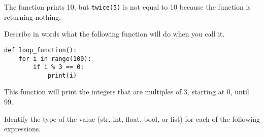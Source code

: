 \documentclass[12pt]{exam}
\begin{document}
\begin{questions}
\begin{solution}
The function prints 10, but \lstinline{twice(5)} is not equal to 10 because the function is returning nothing.  
\end{solution}
\vfill

\question Describe in words what the following function will do when you call it.

\begin{lstlisting}
def loop_function():
    for i in range(100):
        if i % 3 == 0:
            print(i)
\end{lstlisting}

\begin{solution}
This function will print the integers that are multiples of 3, starting at 0, until 99. 
\end{solution}

\question Identify the type of the value (str, int, float, bool, or list) for each of the following expressions.
\end{questions}
\end{document}
